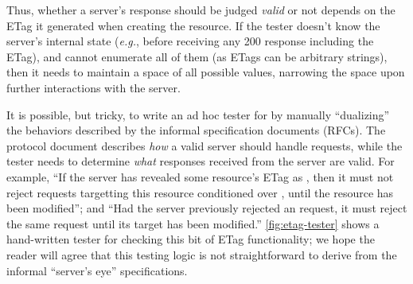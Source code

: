
Thus, whether a server's response should be judged {\em valid} or not
depends on the ETag it generated
when creating the resource.  If the tester doesn't know the server's internal
state ({\it e.g.}, before receiving any 200 response including the ETag), and
cannot enumerate all of them (as ETags can be arbitrary strings), then it needs
to maintain a space of all possible values, narrowing the space upon further
interactions with the server.

It is possible, but tricky, to write an ad hoc tester for \http by
manually ``dualizing'' the behaviors described by the informal specification
documents (RFCs).
The protocol document describes {\em how} a valid server should handle
requests, while the
tester needs to determine {\em what} responses received
from the server are valid.  For example, ``If the server has revealed some
resource's ETag as , then it must not reject requests targetting
this resource conditioned over , until the resource has
been modified''; and ``Had the server previously rejected an 
request, it must reject the same request until its target has been
modified.'' \autoref{fig:etag-tester} shows a hand-written tester for
checking this bit of ETag functionality; we hope the reader will agree that
this testing logic is not straightforward to derive from the informal
``server's eye'' specifications.

